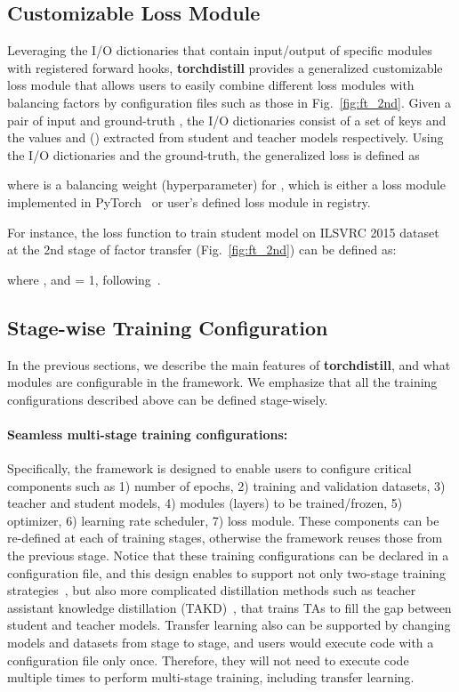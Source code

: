 \documentclass[runningheads]{llncs}
\newcommand{\FRAMEWORK}{{\bf torchdistill}\xspace}
\begin{document}
\subsection{Customizable Loss Module}
\label{subsec:custom_loss_module}
Leveraging the I/O dictionaries that contain input/output of specific modules with registered forward hooks, \FRAMEWORK provides a generalized customizable loss module that allows users to easily combine different loss modules with balancing factors by configuration files such as those in Fig.~\ref{fig:ft_2nd}.
Given a pair of input  and ground-truth , the I/O dictionaries consist of a set of keys  and the values  and  () extracted from student and teacher models respectively.
Using the I/O dictionaries and the ground-truth, the generalized loss is defined as



\noindent where  is a balancing weight (hyperparameter) for , which is either a loss module implemented in PyTorch~\cite{paszke2019pytorch} or user's defined loss module in registry.

For instance, the loss function to train student model on ILSVRC 2015 dataset~\cite{russakovsky2015imagenet} at the 2nd stage of factor transfer (Fig.~\ref{fig:ft_2nd}) can be defined as:


\noindent where ,  and  = 1, following~\cite{kim2018paraphrasing}.


\subsection{Stage-wise Training Configuration}
In the previous sections, we describe the main features of \FRAMEWORK, and what modules are configurable in the framework.
We emphasize that all the training configurations described above can be defined stage-wisely.

\paragraph{Seamless multi-stage training configurations:}
Specifically, the framework is designed to enable users to configure critical components such as 1) number of epochs, 2) training and validation datasets, 3) teacher and student models, 4) modules (layers) to be trained/frozen, 5) optimizer, 6) learning rate scheduler, 7) loss module.
These components can be re-defined at each of training stages, otherwise the framework reuses those from the previous stage.
Notice that these training configurations can be declared in a configuration file, and this design enables to support not only two-stage training strategies~\cite{romero2015fitnets,yim2017gift,kim2018paraphrasing,heo2019knowledge}, but also more complicated distillation methods such as teacher assistant knowledge distillation (TAKD)~\cite{mirzadeh2019improved}, that trains TAs to fill the gap between student and teacher models.
Transfer learning also can be supported by changing models and datasets from stage to stage, and users would execute code with a configuration file only once.
Therefore, they will not need to execute code multiple times to perform multi-stage training, including transfer learning.
\end{document}
